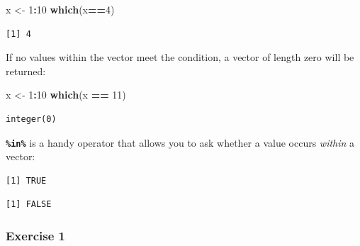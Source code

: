 \documentclass[
]{book}
\newenvironment{Shaded}{\begin{snugshade}}{\end{snugshade}}
\newcommand{\DecValTok}[1]{\textcolor[rgb]{0.00,0.00,0.81}{#1}}
\newcommand{\KeywordTok}[1]{\textcolor[rgb]{0.13,0.29,0.53}{\textbf{#1}}}
\newcommand{\NormalTok}[1]{#1}
\newcommand{\OperatorTok}[1]{\textcolor[rgb]{0.81,0.36,0.00}{\textbf{#1}}}
\newcommand{\StringTok}[1]{\textcolor[rgb]{0.31,0.60,0.02}{#1}}
\begin{document}
\begin{Shaded}
\begin{Highlighting}[]
\NormalTok{x <-}\StringTok{ }\DecValTok{1}\OperatorTok{:}\DecValTok{10}
\KeywordTok{which}\NormalTok{(x}\OperatorTok{==}\DecValTok{4}\NormalTok{)}
\end{Highlighting}
\end{Shaded}

\begin{verbatim}
[1] 4
\end{verbatim}

If no values within the vector meet the condition, a vector of length zero will be returned:

\begin{Shaded}
\begin{Highlighting}[]
\NormalTok{x <-}\StringTok{ }\DecValTok{1}\OperatorTok{:}\DecValTok{10}
\KeywordTok{which}\NormalTok{(x }\OperatorTok{==}\StringTok{ }\DecValTok{11}\NormalTok{)}
\end{Highlighting}
\end{Shaded}

\begin{verbatim}
integer(0)
\end{verbatim}

\textbf{\texttt{\%in\%}} is a handy operator that allows you to ask whether a value occurs \emph{within} a vector:

\begin{Shaded}
\end{Shaded}

\begin{verbatim}
[1] TRUE
\end{verbatim}

\begin{Shaded}
\end{Shaded}

\begin{verbatim}
[1] FALSE
\end{verbatim}

\hypertarget{exercise-1-3}{%
\subsubsection*{Exercise 1}\label{exercise-1-3}}
\end{document}
